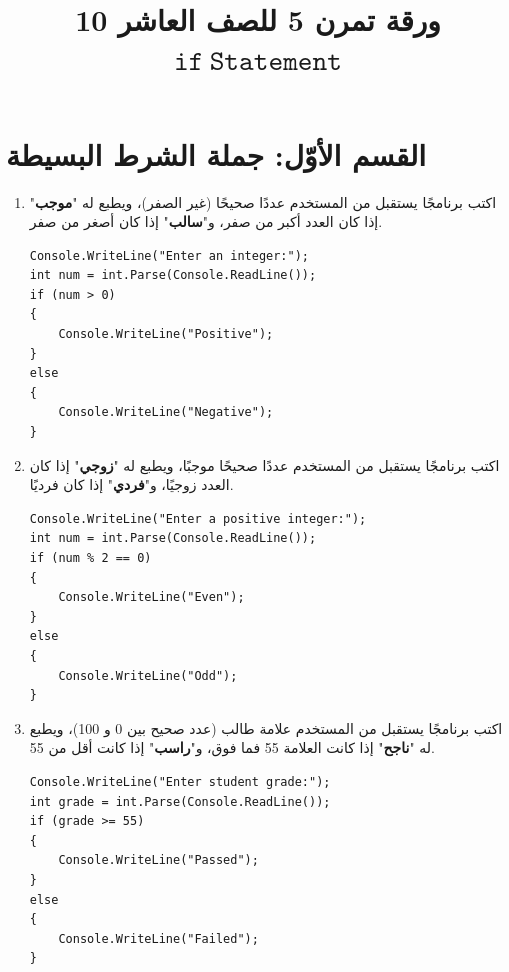 \documentclass[14pt]{extarticle}
\title{ورقة تمرن 5 للصف العاشر 10 $\mathtt{if\ Statement}$}
\begin{document}
\maketitle
\thispagestyle{fancy}

\section*{القسم الأوّل: جملة الشرط البسيطة}

\begin{enumerate}[itemsep=2em]

\item
اكتب برنامجًا يستقبل من المستخدم عددًا صحيحًا (غير الصفر)، ويطبع له "\textbf{موجب}" إذا كان العدد أكبر من صفر، و"\textbf{سالب}" إذا كان أصغر من صفر.
\ifwithsols
\begin{boxSolution}
\begin{english}
\begin{verbatim}
Console.WriteLine("Enter an integer:");
int num = int.Parse(Console.ReadLine());
if (num > 0)
{
    Console.WriteLine("Positive");
}
else
{
    Console.WriteLine("Negative");
}
\end{verbatim}
\end{english}
\end{boxSolution}
\fi
\filbreak

\item
اكتب برنامجًا يستقبل من المستخدم عددًا صحيحًا موجبًا، ويطبع له "\textbf{زوجي}" إذا كان العدد زوجيًا، و"\textbf{فردي}" إذا كان فرديًا.
\ifwithsols
\begin{boxSolution}
\begin{english}
\begin{verbatim}
Console.WriteLine("Enter a positive integer:");
int num = int.Parse(Console.ReadLine());
if (num % 2 == 0)
{
    Console.WriteLine("Even");
}
else
{
    Console.WriteLine("Odd");
}
\end{verbatim}
\end{english}
\end{boxSolution}
\fi

\filbreak
\item
اكتب برنامجًا يستقبل من المستخدم علامة طالب (عدد صحيح بين 0 و 100)، ويطبع له "\textbf{ناجح}" إذا كانت العلامة 55 فما فوق، و"\textbf{راسب}" إذا كانت أقل من 55.
\ifwithsols
\begin{boxSolution}
\begin{english}
\begin{verbatim}
Console.WriteLine("Enter student grade:");
int grade = int.Parse(Console.ReadLine());
if (grade >= 55)
{
    Console.WriteLine("Passed");
}
else
{
    Console.WriteLine("Failed");
}
\end{verbatim}
\end{english}
\end{boxSolution}
\fi


\end{enumerate}
\end{document}

